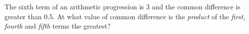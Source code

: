 
%
%
%
%
% 
% 

\question[4] The sixth term of an arithmetic progression is 3 and the common difference is greater than 0.5. 
At what value of common difference is the \textit{product} of the \textit{first}, \textit{fourth} and \textit{fifth}
terms the greatest?


\ifprintanswers
\fi 

